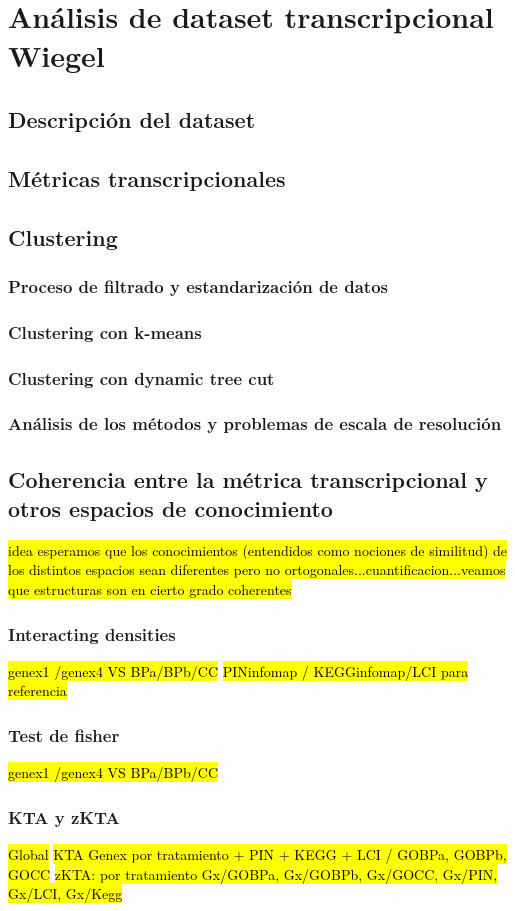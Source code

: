 \chapter{Análisis de dataset transcripcional Wiegel}
\section{Descripción del dataset}
\section{Métricas transcripcionales}
\section{Clustering}
\subsection{Proceso de filtrado y estandarización de datos}
\subsection{Clustering con k-means}
\subsection{Clustering con dynamic tree cut}
\subsection{Análisis de los métodos y problemas de escala de resolución}
\section{Coherencia entre la métrica transcripcional y otros espacios de conocimiento}
\hl{idea esperamos que los conocimientos (entendidos como nociones de similitud) de los distintos espacios sean diferentes pero no ortogonales...cuantificacion...veamos que estructuras son en cierto grado coherentes}
\subsection{Interacting densities}
\hl{genex1 /genex4  VS BPa/BPb/CC}
\hl{PINinfomap / KEGGinfomap/LCI para referencia}
\subsection{Test de fisher}
\hl{genex1 /genex4  VS BPa/BPb/CC}
\subsection{KTA y zKTA}
\hl{Global}
\hl{KTA Genex por tratamiento + PIN + KEGG + LCI / GOBPa, GOBPb, GOCC}
\hl{zKTA: por tratamiento Gx/GOBPa, Gx/GOBPb, Gx/GOCC, Gx/PIN, Gx/LCI, Gx/Kegg}